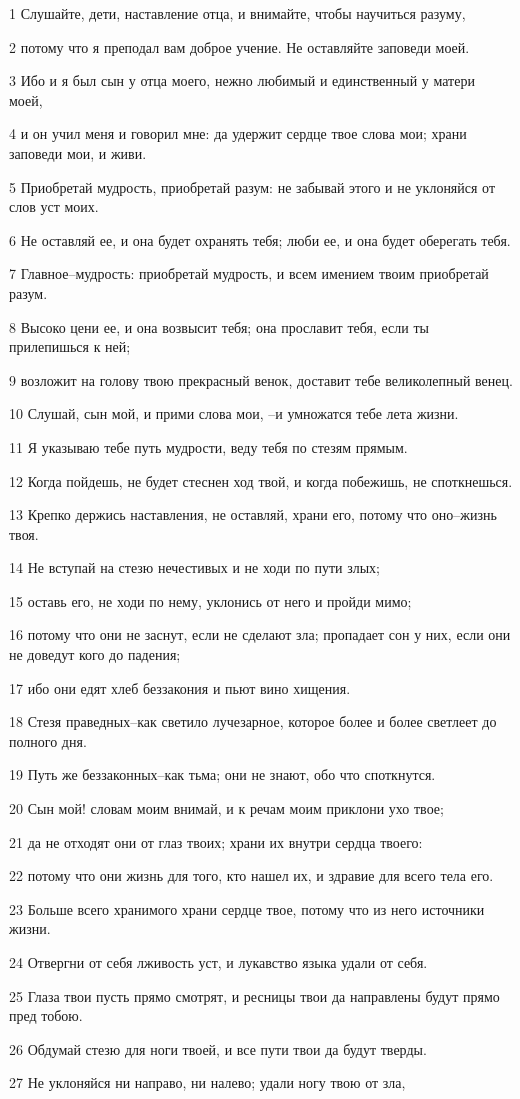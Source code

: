 \par 1 Слушайте, дети, наставление отца, и внимайте, чтобы научиться разуму,
\par 2 потому что я преподал вам доброе учение. Не оставляйте заповеди моей.
\par 3 Ибо и я был сын у отца моего, нежно любимый и единственный у матери моей,
\par 4 и он учил меня и говорил мне: да удержит сердце твое слова мои; храни заповеди мои, и живи.
\par 5 Приобретай мудрость, приобретай разум: не забывай этого и не уклоняйся от слов уст моих.
\par 6 Не оставляй ее, и она будет охранять тебя; люби ее, и она будет оберегать тебя.
\par 7 Главное--мудрость: приобретай мудрость, и всем имением твоим приобретай разум.
\par 8 Высоко цени ее, и она возвысит тебя; она прославит тебя, если ты прилепишься к ней;
\par 9 возложит на голову твою прекрасный венок, доставит тебе великолепный венец.
\par 10 Слушай, сын мой, и прими слова мои, --и умножатся тебе лета жизни.
\par 11 Я указываю тебе путь мудрости, веду тебя по стезям прямым.
\par 12 Когда пойдешь, не будет стеснен ход твой, и когда побежишь, не споткнешься.
\par 13 Крепко держись наставления, не оставляй, храни его, потому что оно--жизнь твоя.
\par 14 Не вступай на стезю нечестивых и не ходи по пути злых;
\par 15 оставь его, не ходи по нему, уклонись от него и пройди мимо;
\par 16 потому что они не заснут, если не сделают зла; пропадает сон у них, если они не доведут кого до падения;
\par 17 ибо они едят хлеб беззакония и пьют вино хищения.
\par 18 Стезя праведных--как светило лучезарное, которое более и более светлеет до полного дня.
\par 19 Путь же беззаконных--как тьма; они не знают, обо что споткнутся.
\par 20 Сын мой! словам моим внимай, и к речам моим приклони ухо твое;
\par 21 да не отходят они от глаз твоих; храни их внутри сердца твоего:
\par 22 потому что они жизнь для того, кто нашел их, и здравие для всего тела его.
\par 23 Больше всего хранимого храни сердце твое, потому что из него источники жизни.
\par 24 Отвергни от себя лживость уст, и лукавство языка удали от себя.
\par 25 Глаза твои пусть прямо смотрят, и ресницы твои да направлены будут прямо пред тобою.
\par 26 Обдумай стезю для ноги твоей, и все пути твои да будут тверды.
\par 27 Не уклоняйся ни направо, ни налево; удали ногу твою от зла,

